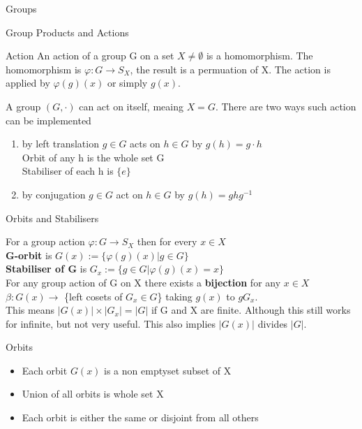 \documentclass[12pt, letterpaper]{article}
\begin{document}
\begin{section}{Groups}
\begin{subsection}{Group Products and Actions}
\begin{subsubsection}{Action}
      An action of a group G on a set \(X \neq \emptyset\) is a homomorphism.
      The homomorphism is \(\varphi : G \to S_{X}\), the result is a permuation
      of X. The action is applied by \(\varphi(g)(x)\) or simply \(g(x)\).

      A group \((G, \cdot)\) can act on itself, meaing \(X = G\).  There are two
      ways such action can be implemented
      \begin{enumerate}
        \item by left translation \(g \in G\) acts on \(h \in G\) by
              \(g(h) = g \cdot h\) \\
              Orbit of any h is the whole set G \\
              Stabiliser of each h is \(\{ e \}\)
        \item by conjugation \(g \in G\) act on \(h \in G\) by
              \(g(h) = ghg^{-1}\)
      \end{enumerate}

    \end{subsubsection}

  \end{subsection}

  \begin{subsection}{Orbits and Stabilisers}

    For a group action \(\varphi : G \to S_{X}\) then for every \(x \in X\) \\
    \textbf{G-orbit} is \(G(x) := \{ \varphi(g)(x) | g \in G \}\) \\
    \textbf{Stabiliser of G} is \(G_{x} := \{ g \in G | \varphi(g)(x) = x \}\) \\

    For any group action of G on X there exists a \textbf{bijection} for any
    \(x \in X\) \(\beta : G(x) \to\) \{left cosets of \(G_{x} \in G\)\} taking
    \(g(x)\) to \(gG_{x}\). \\
    This means \(|G(x)| \times |G_{x}| = |G|\) if G and X are finite. Although
    this still works for infinite, but not very useful. This also implies
    \(|G(x)|\) divides \(|G|\).

    \begin{subsubsection}{Orbits}

      \begin{itemize}
        \item Each orbit \(G(x)\) is a non emptyset subset of X
        \item Union of all orbits is whole set X
        \item Each orbit is either the same or disjoint from all others
      \end{itemize}


\end{subsubsection}
\end{subsection}
\end{section}
\end{document}
